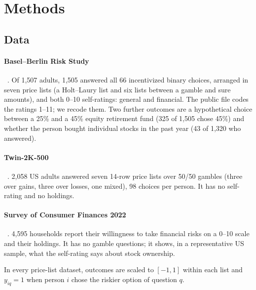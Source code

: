 \documentclass{article}
\begin{document}
\section{Methods}

\subsection{Data}

\paragraph{Basel--Berlin Risk Study}~\citep{frey2017}. Of 1,507 adults, 1,505 answered all 66 incentivized binary choices, arranged in seven price lists (a Holt--Laury list and six lists between a gamble and sure amounts), and both 0--10 self-ratings: general and financial. The public file codes the ratings 1--11; we recode them. Two further outcomes are a hypothetical choice between a 25\% and a 45\% equity retirement fund (325 of 1,505 chose 45\%) and whether the person bought individual stocks in the past year (43 of 1,320 who answered).

\paragraph{Twin-2K-500}~\citep{toubia2025}. 2,058 US adults answered seven 14-row price lists over 50/50 gambles (three over gains, three over losses, one mixed), 98 choices per person. It has no self-rating and no holdings.

\paragraph{Survey of Consumer Finances 2022}~\citep{scf2022}. 4,595 households report their willingness to take financial risks on a 0--10 scale and their holdings. It has no gamble questions; it shows, in a representative US sample, what the self-rating says about stock ownership.

In every price-list dataset, outcomes are scaled to $[-1, 1]$ within each list and $y_{iq} = 1$ when person $i$ chose the riskier option of question $q$.
\end{document}
